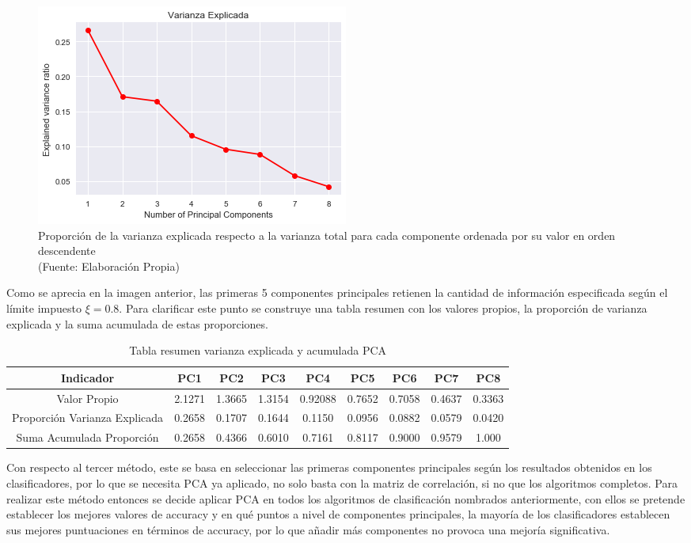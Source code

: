 \begin{figure}[ht!]
\centering
\includegraphics[width=.6\textwidth]{figures/varianza_ratio.png}
\caption[Proporción de la varianza explicada PCA]{Proporción de la varianza explicada respecto a la varianza total para cada componente ordenada por su valor en orden descendente  \\
{\scriptsize (Fuente: Elaboración Propia)}}
\label{fig:varianza_ratio}
\end{figure}

Como se aprecia en la imagen anterior, las primeras 5 componentes principales retienen la cantidad de información especificada según el límite impuesto $\xi =0.8$. Para clarificar este punto se construye una tabla resumen con los valores propios, la proporción de varianza explicada y la suma acumulada de estas proporciones.

\begin{table}[ht!]
\centering
\caption[Tabla resumen varianza explicada y acumulada PCA]{Tabla resumen varianza explicada y acumulada PCA}
\label{my-label}
\begin{tabular}{|c|c|c|c|c|c|c|c|c|}
\hline
Indicador                     & PC1    & PC2    & PC3    & PC4     & PC5    & PC6    & PC7    & PC8    \\ \hline
Valor Propio                  & 2.1271 & 1.3665 & 1.3154 & 0.92088 & 0.7652 & 0.7058 & 0.4637 & 0.3363 \\ \hline
Proporción Varianza Explicada & 0.2658 & 0.1707 & 0.1644 & 0.1150  & 0.0956 & 0.0882 & 0.0579 & 0.0420 \\ \hline
Suma Acumulada Proporción     & 0.2658 & 0.4366 & 0.6010 & 0.7161  & 0.8117 & 0.9000 & 0.9579 & 1.000  \\ \hline
\end{tabular}
\end{table}

Con respecto al tercer método, este se basa en seleccionar las primeras componentes principales según los resultados obtenidos en los clasificadores, por lo que se necesita PCA ya aplicado, no solo basta con la matriz de correlación, si no que los algoritmos completos. Para realizar este método entonces se decide aplicar PCA en todos los algoritmos de clasificación nombrados anteriormente, con ellos se pretende establecer los mejores valores de accuracy y en qué puntos a nivel de componentes principales, la mayoría de los clasificadores establecen sus mejores puntuaciones en términos de accuracy, por lo que añadir más componentes no provoca una mejoría significativa.

